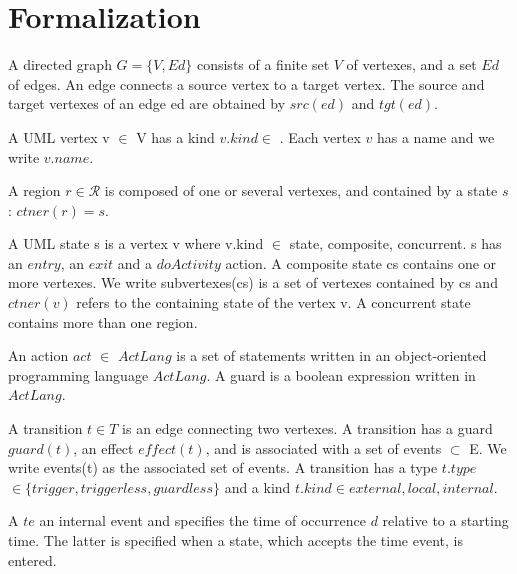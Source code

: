 \section{Formalization}
\begin{definition}A directed graph $G = \{V, Ed\}$ consists of a finite set $V$ of vertexes, and a set $Ed$ of edges. An edge connects a source vertex to a target vertex. The source and target vertexes of an edge ed are obtained by $src(ed)$ and $tgt(ed)$.
\end{definition}

\begin{definition}A UML vertex v $\in$ V has a kind $v.kind \in$  . Each vertex $v$ has a name and we write $v.name$. 
\end{definition} 

\begin{definition}A region $r \in \mathcal{R}$ is composed of one or several vertexes, and contained by a state $s$: $ctner(r) = s$. 
\end{definition}	

\begin{definition} A UML state s is a vertex v where v.kind $\in$ {state, composite, concurrent}. s has an $entry$, an $exit$ and a $doActivity$ action. A composite state cs contains one or more vertexes. We write subvertexes(cs) is a set of vertexes contained by cs and $ctner(v)$ refers to the containing state of the vertex v. A concurrent state contains more than one region.
\end{definition}		

\begin{definition} An action $act$ $\in$ $ActLang$ is a set of statements written in an object-oriented programming language $ActLang$. A guard is a boolean expression written in $ActLang$.
\end{definition}

\begin{definition} A transition $t \in T$ is an edge connecting two vertexes. A transition has a guard $guard(t)$, an effect $effect(t)$, and is associated with a set of events $\subset$ E. We write events(t) as the associated set of events. A transition has a type $t.type$ $\in \{trigger, triggerless, guardless\}$ and a kind $t.kind \in {external, local, internal}$.
\end{definition}

\begin{definition} A  $te$ an internal event and specifies the time of occurrence $d$ relative to a starting time. The latter is specified when a state, which accepts the time event, is entered. 
\end{definition}

